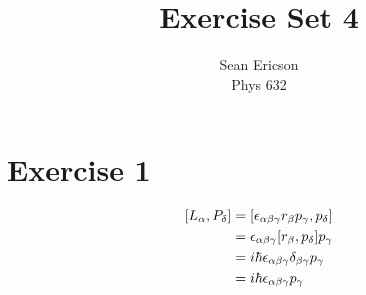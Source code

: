\documentclass[12pt]{article}
\begin{document}
	
\title{Exercise Set 4}
\author{Sean Ericson \\ Phys 632}
\maketitle

\section*{Exercise 1}
\begin{align*}
    \comm{L_\alpha}{P_\delta} & = \comm{\epsilon_{\alpha\beta\gamma}r_\beta p_\gamma}{p_\delta} \\
    & = \epsilon_{\alpha\beta\gamma} \comm{r_\beta}{p_\delta}p_\gamma \\
    & = i\hbar\epsilon_{\alpha\beta\gamma}\delta_{\beta\gamma}p_\gamma \\
    & = i\hbar \epsilon_{\alpha\beta\gamma} p_\gamma
\end{align*}
\end{document}
